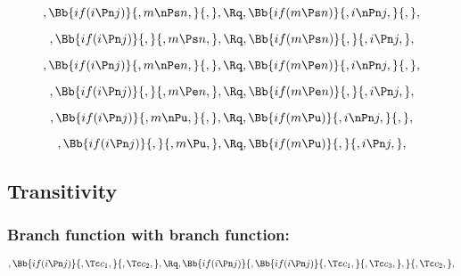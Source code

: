 \bigskip
\bigskip
\[, \Bb{if(i \Pn j)}{,m \nPs n,}{,}, \Rq , \Bb{if(m \Ps n)}{,i \nPn j,}{,},\]

\bigskip
\bigskip
\[, \Bb{if(i \Pn j)}{,}{,m \Ps n,}, \Rq , \Bb{if(m \Ps n)}{,}{,i \Pn j,},\]

\bigskip
\bigskip
\[, \Bb{if(i \Pn j)}{,m \nPe n,}{,}, \Rq , \Bb{if(m \Pe n)}{,i \nPn j,}{,},\]

\bigskip
\bigskip
\[, \Bb{if(i \Pn j)}{,}{,m \Pe n,}, \Rq , \Bb{if(m \Pe n)}{,}{,i \Pn j,},\]

\bigskip
\bigskip
\[, \Bb{if(i \Pn j)}{,m \nPu,}{,}, \Rq , \Bb{if(m \Pu)}{,i \nPn j,}{,},\]

\bigskip
\bigskip
\[, \Bb{if(i \Pn j)}{,}{,m \Pu,}, \Rq , \Bb{if(m \Pu)}{,}{,i \Pn j,},\]




\bigskip
\bigskip
\bigskip
\bigskip
\subsection{Transitivity}
\subsubsection{Branch function with branch function:}
\[, \Bb{if(i \Pn j)}{,\Tc c_1,}{,\Tc c_2,}, \Rq , \Bb{if(i \Pn j)}{,\Bb{if(i \Pn j)}{,\Tc c_1,}{,\Tc c_3,},}{,\Tc c_2,},\]

